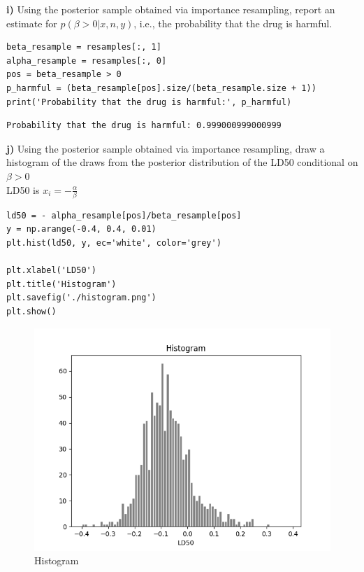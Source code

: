 \documentclass{article}
\begin{document}
\textbf{i)} Using the posterior sample obtained via importance resampling, report an estimate for $p(\beta> 0|x, n, y)$, i.e., the probability that the drug is harmful.

\begin{verbatim} 
beta_resample = resamples[:, 1]
alpha_resample = resamples[:, 0]
pos = beta_resample > 0
p_harmful = (beta_resample[pos].size/(beta_resample.size + 1))
print('Probability that the drug is harmful:', p_harmful)
\end{verbatim}

\begin{verbatim}  
Probability that the drug is harmful: 0.999000999000999
\end{verbatim}
 
 
\textbf{j)}  Using the posterior sample obtained via importance resampling, draw a histogram of the draws from the posterior distribution of the LD50 conditional on $\beta>0$\\
 
LD50 is $x_i=-\frac{\alpha}{\beta}$
\begin{verbatim}  
ld50 = - alpha_resample[pos]/beta_resample[pos]
y = np.arange(-0.4, 0.4, 0.01)
plt.hist(ld50, y, ec='white', color='grey')

plt.xlabel('LD50')
plt.title('Histogram')
plt.savefig('./histogram.png')
plt.show()
\end{verbatim}

\begin{figure}[H]
\centering  
\includegraphics[scale=0.6]{histogram.png}
\caption{Histogram}
\label{fig: label}
\end{figure}
\end{document}
